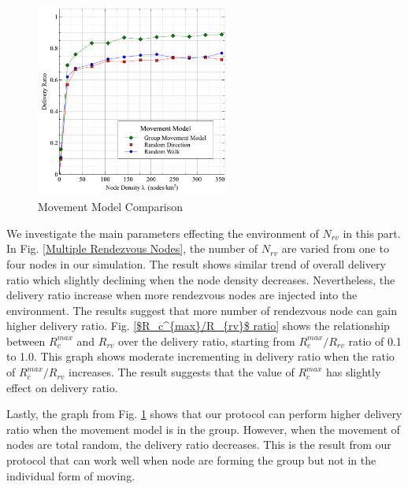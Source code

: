 \documentclass[conference]{IEEEtran}
\begin{document}
\begin{figure}[!t]
\centering
\includegraphics[width=2.5in]{Graphs/movement.pdf}
\caption{Movement Model Comparison}
\label{Movement Model Comparison}
\end{figure}

We investigate the main parameters effecting the environment of $N_{rv}$ in this part.
In Fig. \ref{Multiple Rendezvous Nodes}, the number of $N_{rv}$ are varied from one to four nodes in our simulation.
The result shows similar trend of overall delivery ratio which slightly declining when the node density decreases.
Nevertheless, the delivery ratio increase when more rendezvous nodes are injected into the environment.
The results suggest that more number of rendezvous node can gain higher delivery ratio.
Fig. \ref{$R_c^{max}/R_{rv}$ ratio} shows the relationship between $R_c^{max}$ and $R_{rv}$ over the delivery ratio, starting from  $R_c^{max}/R_{rv}$ ratio of 0.1 to 1.0.
This graph shows moderate incrementing in delivery ratio when the ratio of $R_c^{max}/R_{rv}$ increases.
The result suggests that the value of $R_c^{max}$ has slightly effect on delivery ratio. 

Lastly, the graph from Fig. \ref{Movement Model Comparison} shows that our protocol can perform higher delivery ratio when the movement model is in the group.
However, when the movement of nodes are total random, the delivery ratio decreases.
This is the result from our protocol that can work well when node are forming the group but not in the individual form of moving.

\end{document}
